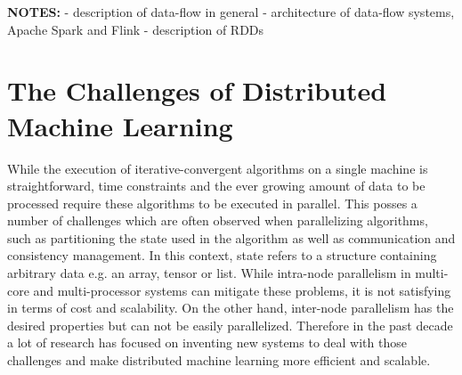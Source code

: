 \textbf{NOTES:}
- description of data-flow in general
- architecture of data-flow systems, Apache Spark and Flink
- description of RDDs

\section{The Challenges of Distributed Machine Learning}
\label{s:distributed_ml}
While the execution of iterative-convergent algorithms on a single machine is straightforward, time constraints and the ever growing amount of data to be processed require these algorithms to be executed in parallel.
This posses a number of challenges which are often observed when parallelizing algorithms, such as partitioning the state used in the algorithm as well as communication and consistency management.
In this context, state refers to a structure containing arbitrary data e.g. an array, tensor or list.
While intra-node parallelism in multi-core and multi-processor systems can mitigate these problems, it is not satisfying in terms of cost and scalability.
On the other hand, inter-node parallelism has the desired properties but can not be easily parallelized.
Therefore in the past decade a lot of research has focused on inventing new systems to deal with those challenges and make distributed machine learning more efficient and scalable.

